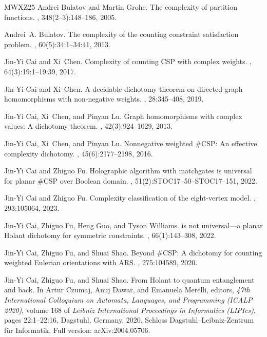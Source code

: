 \documentclass[11pt,letterpaper,onecolumn]{article}
\theoremstyle{plain}
\theoremstyle{definition}
\theoremstyle{remark}
\begin{document}
\begin{thebibliography}{MWXZ25}
Andrei Bulatov and Martin Grohe.
\newblock The complexity of partition functions.
, 348(2--3):148--186, 2005.

Andrei~A. Bulatov.
\newblock The complexity of the counting constraint satisfaction problem.
, 60(5):34:1--34:41, 2013.

Jin-Yi Cai and Xi~Chen.
\newblock Complexity of counting {CSP} with complex weights.
, 64(3):19:1--19:39, 2017.

Jin-Yi Cai and Xi~Chen.
\newblock A decidable dichotomy theorem on directed graph homomorphisms with
  non-negative weights.
, 28:345--408, 2019.

Jin-Yi Cai, Xi~Chen, and Pinyan Lu.
\newblock Graph homomorphisms with complex values: A dichotomy theorem.
, 42(3):924--1029, 2013.

Jin-Yi Cai, Xi~Chen, and Pinyan Lu.
\newblock Nonnegative weighted {{\#CSP}}: An effective complexity dichotomy.
, 45(6):2177--2198, 2016.

Jin-Yi Cai and Zhiguo Fu.
\newblock Holographic algorithm with matchgates is universal for planar
  {{\#CSP}} over {Boolean} domain.
, 51(2):STOC17--50--STOC17--151, 2022.

Jin-Yi Cai and Zhiguo Fu.
\newblock Complexity classification of the eight-vertex model.
, 293:105064, 2023.

Jin-Yi Cai, Zhiguo Fu, Heng Guo, and Tyson Williams.
 is not universal---a planar {Holant} dichotomy for symmetric
  constraints.
, 66(1):143--308, 2022.

Jin-Yi Cai, Zhiguo Fu, and Shuai Shao.
\newblock Beyond {{\#CSP}}: A dichotomy for counting weighted {Eulerian}
  orientations with {ARS}.
, 275:104589, 2020.

Jin-Yi Cai, Zhiguo Fu, and Shuai Shao.
\newblock From {Holant} to quantum entanglement and back.
\newblock In Artur Czumaj, Anuj Dawar, and Emanuela Merelli, editors, {\em 47th
  International Colloquium on Automata, Languages, and Programming (ICALP
  2020)}, volume 168 of {\em Leibniz International Proceedings in Informatics
  (LIPIcs)}, pages 22:1--22:16, Dagstuhl, Germany, 2020. Schloss
  Dagstuhl--Leibniz-Zentrum f{\"u}r Informatik.
\newblock Full version: arXiv:2004.05706.


\end{thebibliography}
\end{document}
